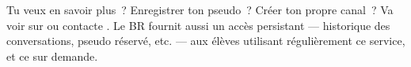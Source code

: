  Tu veux en savoir plus~? Enregistrer ton pseudo~? Créer ton propre canal~? Va voir sur  ou contacte .
 Le BR fournit aussi un accès persistant — historique des conversations, pseudo réservé, etc. — aux élèves utilisant régulièrement ce service, et ce sur demande.


